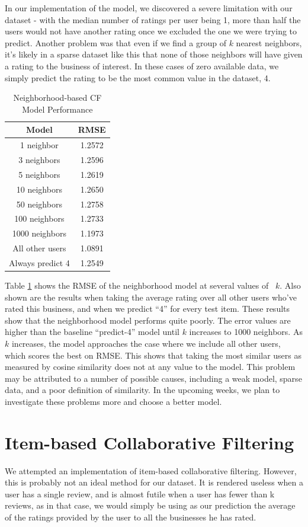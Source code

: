 \documentclass[10pt, letterpaper]{article}
\begin{document}
In our implementation of the model, we discovered a severe
limitation with our dataset - with the median number of ratings per user
being 1, more than half the users would not have another rating once we
excluded the one we were trying to predict. Another problem was that even if we 
find a group of $k$ nearest neighbors, it's 
likely in a sparse dataset like this that none of those neighbors will have 
given a rating to the business of interest. In these cases of zero available data, we simply predict the rating to be the 
most common value in the dataset, 4. 

\begin{table}[htb]
\centering
\begin{tabular}{|c|c|}
\hline
{\bf Model} &{\bf RMSE} \tabularnewline \hline
1 neighbor &1.2572 \tabularnewline
3 neighbors &1.2596 \tabularnewline
5 neighbors &1.2619 \tabularnewline
10 neighbors &1.2650 \tabularnewline
50 neighbors &1.2758 \tabularnewline
100 neighbors &1.2733 \tabularnewline
1000 neighbors &1.1973 \tabularnewline
\hline
All other users &1.0891 \tabularnewline
Always predict 4 &1.2549
\tabularnewline \hline

\end{tabular}
\caption{ Neighborhood-based CF Model Performance }
\label{ncf}
\end{table}

Table \ref{ncf} shows the RMSE of the neighborhood model at several values 
of ~$k$. Also shown are the results when taking the average rating over all 
other users who've rated this business, and when we predict ``4'' for every 
test item. These results show that the neighborhood model performs quite 
poorly. The error values are higher than the baseline ``predict-4'' model 
until $k$ increases to 1000 neighbors. As $k$ increases, the model approaches 
the case where we include all other users, which scores the best on RMSE. This 
shows that taking the most similar users as measured by cosine similarity does 
not at any value to the model. This problem may be attributed to a number of 
possible causes, including a weak model, sparse data, and a poor definition of 
similarity. In the upcoming weeks, we plan to investigate these problems more 
and choose a better model.




\section{Item-based Collaborative Filtering}
We attempted an implementation of item-based collaborative
filtering. However, this is probably not an ideal method for our
dataset. It is rendered useless when a user has a single review, and is
almost futile when a user has fewer than k reviews, as in that case, we
would simply be using as our prediction the average of the ratings
provided by the user to all the businesses he has rated.
\end{document}
